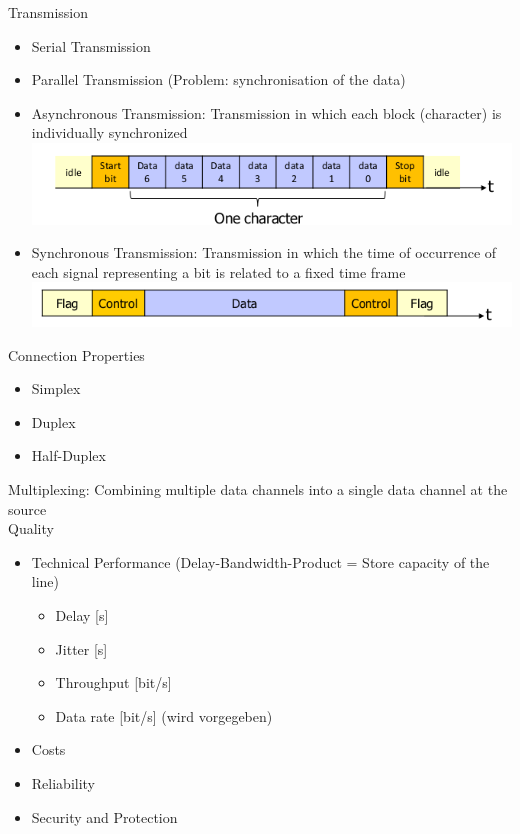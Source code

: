 \documentclass[11pt,ngerman]{article}
\begin{document}
\noindent Transmission
\begin{itemize}[noitemsep,nolistsep]
	\item Serial Transmission
	\item Parallel Transmission (Problem: synchronisation of the data)
	\item Asynchronous Transmission:	Transmission	in	which	each	block	
(character)	is	individually	synchronized\\
\includegraphics[width=5in]{images/Selection_002.png}

	\item Synchronous Transmission:	Transmission	in	which	the	time	of	
occurrence	of	each	signal	representing	a	bit	is	related	to	a	fixed	time	
frame \\
\includegraphics[width=5in]{images/Selection_003.png}
\end{itemize}

\noindent Connection	Properties
\begin{itemize}[noitemsep,nolistsep]
\item Simplex
\item Duplex
\item Half-Duplex\\
\end{itemize}

\noindent Multiplexing:
Combining	multiple	data	
channels	into	a	single	data	
channel	at	the	source\\

\noindent Quality\\
\begin{itemize}[noitemsep,nolistsep]
	\item Technical	Performance (Delay-Bandwidth-Product	=	
Store	capacity of	the	line)
	\begin{itemize}[noitemsep,nolistsep]
		\item Delay	[s]
		\item Jitter	[s]
		\item Throughput	[bit/s]
		\item Data	rate	[bit/s] (wird vorgegeben)
	\end{itemize}
	\item Costs
	\item Reliability
	\item Security	and	Protection\\
\end{itemize}
\end{document}
